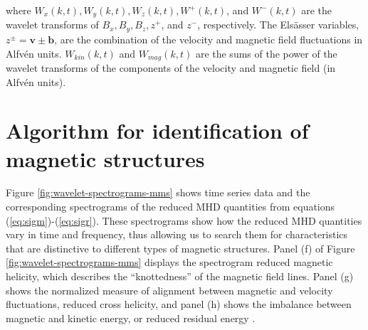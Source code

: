\noindent where $W_x(k,t),W_y(k,t),W_z(k,t),W^+(k,t)$, and $W^-(k,t)$ are the wavelet transforms of $B_x,B_y,B_z,z^+$, and $z^-$, respectively. The Els\"asser variables, $z^\pm = \mathbf{v} \pm \mathbf{b}$, are the combination of the velocity and magnetic field fluctuations in Alfv\'en units. $W_{kin}(k,t)$ and $W_{mag}(k,t)$ are the sums of the power of the wavelet transforms of the components of the velocity and magnetic field (in Alfv\'en units).



\section{Algorithm for identification of magnetic structures} \label{sec:wavelet-algorithm}
Figure \ref{fig:wavelet-spectrograms-mms} shows time series data and the corresponding spectrograms of the reduced MHD quantities from equations (\ref{eq:sigm})-(\ref{eq:sigr}). These spectrograms show how the reduced MHD quantities vary in time and frequency, thus allowing us to search them for characteristics that are distinctive to different types of magnetic structures. Panel (f) of Figure \ref{fig:wavelet-spectrograms-mms} displays the spectrogram reduced magnetic helicity, which describes the “knottedness” of the magnetic field lines. Panel (g) shows the normalized measure of alignment between magnetic and velocity fluctuations, reduced cross helicity, and panel (h) shows the imbalance between magnetic and kinetic energy, or reduced residual energy \citep{Matthaeus:1982}.

